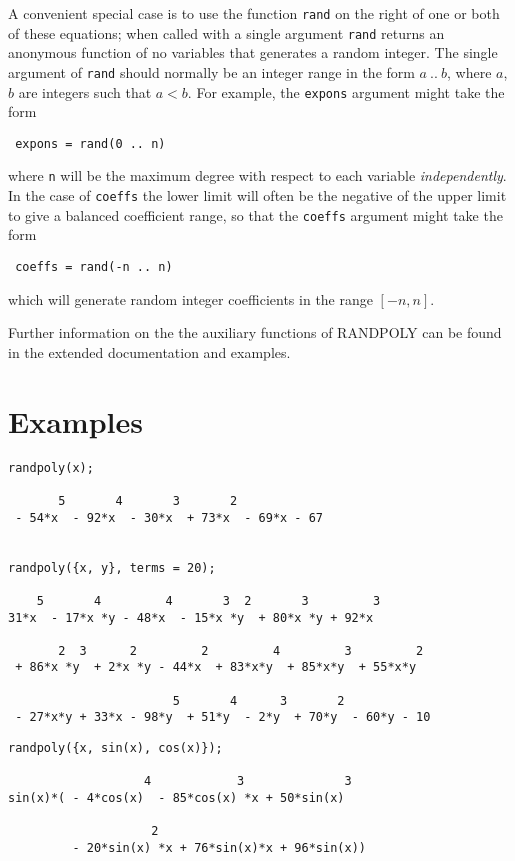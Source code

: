 \documentclass[11pt,letterpaper]{book}
\begin{document}
A convenient special case is to use the function {\tt rand} on the
right of one or both of these equations; when called with a single
argument {\tt rand} returns an anonymous function of no variables that
generates a random integer.  The single argument of {\tt rand} should
normally be an integer range in the form $a~..~b$, where $a$, $b$ are
integers such that $a < b$.   For example, the {\tt expons} argument might
take the form
\begin{center}\tt
  expons = rand(0~..~n)
\end{center}
where {\tt n} will be the maximum degree with respect to each variable
{\em independently}.  In the case of {\tt coeffs} the lower limit will
often be the negative of the upper limit to give a balanced
coefficient range, so that the {\tt coeffs} argument might take the
form
\begin{center}\tt
  coeffs = rand(-n~..~n)
\end{center}
which will generate random integer coefficients in the range $[-n,n]$.

Further information on the the auxiliary functions of RANDPOLY can be
found in the extended documentation and examples.

\section{Examples}
\label{sec:Examples}

{\small\begin{verbatim}
randpoly(x);

       5       4       3       2
 - 54*x  - 92*x  - 30*x  + 73*x  - 69*x - 67


randpoly({x, y}, terms = 20);

    5       4         4       3  2       3         3
31*x  - 17*x *y - 48*x  - 15*x *y  + 80*x *y + 92*x

       2  3      2         2         4         3         2
 + 86*x *y  + 2*x *y - 44*x  + 83*x*y  + 85*x*y  + 55*x*y

                       5       4      3       2
 - 27*x*y + 33*x - 98*y  + 51*y  - 2*y  + 70*y  - 60*y - 10
\end{verbatim}}
\newpage
{\small\begin{verbatim}
randpoly({x, sin(x), cos(x)});

                   4            3              3
sin(x)*( - 4*cos(x)  - 85*cos(x) *x + 50*sin(x)

                    2
         - 20*sin(x) *x + 76*sin(x)*x + 96*sin(x))
\end{verbatim}}
\end{document}
